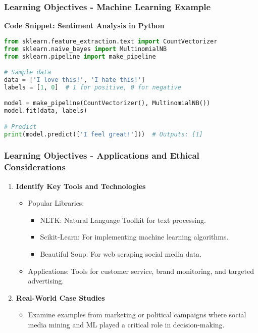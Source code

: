 \documentclass{beamer}
\begin{document}
\begin{frame}[fragile]
    \frametitle{Learning Objectives - Machine Learning Example}
    \textbf{Code Snippet: Sentiment Analysis in Python}
    \begin{lstlisting}[language=Python]
from sklearn.feature_extraction.text import CountVectorizer
from sklearn.naive_bayes import MultinomialNB
from sklearn.pipeline import make_pipeline

# Sample data
data = ['I love this!', 'I hate this!']
labels = [1, 0]  # 1 for positive, 0 for negative

model = make_pipeline(CountVectorizer(), MultinomialNB())
model.fit(data, labels)

# Predict
print(model.predict(['I feel great!']))  # Outputs: [1]
    \end{lstlisting}
\end{frame}

\begin{frame}
    \frametitle{Learning Objectives - Applications and Ethical Considerations}
    \begin{enumerate}[start=3]
        \item \textbf{Identify Key Tools and Technologies}
        \begin{itemize}
            \item Popular Libraries:
            \begin{itemize}
                \item NLTK: Natural Language Toolkit for text processing.
                \item Scikit-Learn: For implementing machine learning algorithms.
                \item Beautiful Soup: For web scraping social media data.
            \end{itemize}
            \item Applications: Tools for customer service, brand monitoring, and targeted advertising.
        \end{itemize}
    
        \item \textbf{Real-World Case Studies}
        \begin{itemize}
            \item Examine examples from marketing or political campaigns where social media mining and ML played a critical role in decision-making.
        \end{itemize}
    \end{enumerate}
\end{frame}
\end{document}
